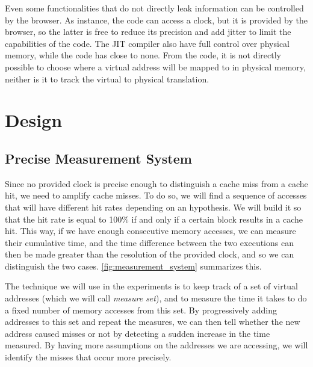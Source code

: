 \documentclass[a4paper,11pt,oneside]{report}
\begin{document}
Even some functionalities that do not directly leak information can be controlled by the browser. As instance, the code can access a clock, but it is provided by the browser, so the latter is free to reduce its precision and add jitter to limit the capabilities of the code. The JIT compiler also have full control over physical memory, while the code has close to none. From the code, it is not directly possible to choose where a virtual address will be mapped to in physical memory, neither is it to track the virtual to physical translation.

\chapter{Design}



\section{Precise Measurement System}

Since no provided clock is precise enough to distinguish a cache miss from a cache hit, we need to amplify cache misses. To do so, we will find a sequence of accesses that will have different hit rates depending on an hypothesis. We will build it so that the hit rate is equal to 100\% if and only if a certain block results in a cache hit. This way, if we have enough consecutive memory accesses, we can measure their cumulative time, and the time difference between the two executions can then be made greater than the resolution of the provided clock, and so we can distinguish the two cases. \autoref{fig:measurement_system} summarizes this.

The technique we will use in the experiments is to keep track of a set of virtual addresses (which we will call \emph{measure set}), and to measure the time it takes to do a fixed number of memory accesses from this set. By progressively adding addresses to this set and repeat the measures, we can then tell whether the new address caused misses or not by detecting a sudden increase in the time measured. By having more assumptions on the addresses we are accessing, we will identify the misses that occur more precisely.
\end{document}
